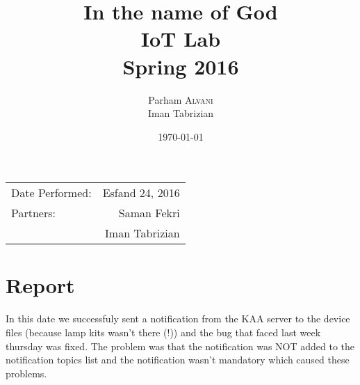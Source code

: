 \documentclass{article}
\title{In the name of God \\ IoT Lab \\ Spring 2016} %
\author{Parham \textsc{Alvani} \\ Iman Tabrizian} %
\date{\today} %
\begin{document}
\maketitle %

\begin{center}
\begin{tabular}{l r}
    Date Performed: & Esfand 24, 2016 \\ %
    Partners: & Saman Fekri \\ %
          & Iman Tabrizian \\
\end{tabular}
\end{center}



\section{Report}
In this date we successfuly sent a notification from the KAA server to the
device files (because lamp kits wasn't there (!)) and the bug that faced last week
thursday was fixed. The problem was that the notification was NOT added to the
notification topics list and the notification wasn't mandatory which caused these
problems.
\end{document}
